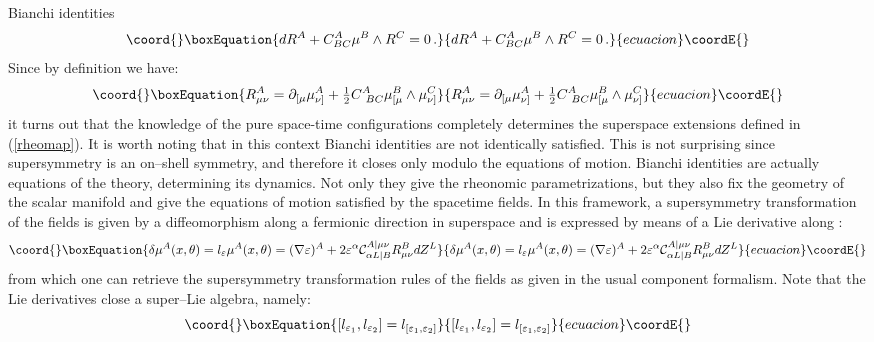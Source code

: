 \documentclass[a4paper,12pt]{article}
\providecommand{\ft}[2]{{\textstyle\frac{#1}{#2}}}
\begin{document}
Bianchi identities
\begin{equation}\coord{}\boxEquation{
dR^A+C^A_{BC}\mu^B\wedge R^C=0\,.
}{
dR^A+C^A_{BC}\mu^B\wedge R^C=0\,.
}{ecuacion}\coordE{}\end{equation}
Since by definition we have:
\begin{equation}\coord{}\boxEquation{
R^A_{\mu\nu}=\partial_{[\mu}\mu^A_{\nu]}+{\ft 1 2} C^A_{~BC}\mu^B_{[\mu}\wedge\mu^C_{\nu]}
}{
R^A_{\mu\nu}=\partial_{[\mu}\mu^A_{\nu]}+{\ft 1 2} C^A_{~BC}\mu^B_{[\mu}\wedge\mu^C_{\nu]}
}{ecuacion}\coordE{}\end{equation}
it turns out that the knowledge of the pure space-time configurations
\coordHE{}
completely determines the superspace extensions defined in (\ref{rheomap}).
It is worth noting that in this context  Bianchi
identities are not identically satisfied. This
is not surprising since supersymmetry is an on--shell symmetry,
and therefore it closes only modulo the equations of motion.
Bianchi identities are actually
equations of the theory, determining its dynamics.  Not only they give the
rheonomic parametrizations, but they also fix the geometry of the scalar manifold
and give the equations of motion satisfied by the spacetime fields.
In this framework, a supersymmetry transformation of the fields \coordHE{} is
given by a diffeomorphism along a fermionic direction in superspace
\myHighlight{$\varepsilon=\varepsilon^{\alpha}\partial_{\alpha}$}\coordHE{} and is expressed
by means of a Lie derivative along \myHighlight{$\varepsilon$}\coordHE{}:
\begin{equation}\coord{}\boxEquation{
\delta\mu^A(x,\theta)=l_{\varepsilon}\mu^A(x,\theta) = (\nabla\varepsilon)^A
+ 2 \varepsilon^{\alpha}\mathcal{C}^{A|\mu\nu}_{\alpha L|B}R^B_{\mu\nu}dZ^L
\label{lie}
}{
\delta\mu^A(x,\theta)=l_{\varepsilon}\mu^A(x,\theta) = (\nabla\varepsilon)^A
+ 2 \varepsilon^{\alpha}\mathcal{C}^{A|\mu\nu}_{\alpha L|B}R^B_{\mu\nu}dZ^L
}{ecuacion}\coordE{}\end{equation}
from which one can retrieve the  supersymmetry transformation rules of the
fields \myHighlight{$\delta\psi_{\mu},\dots$}\coordHE{} as given
in the usual component formalism. Note that the Lie derivatives \coordHE{}
close a super--Lie algebra, namely:
\begin{equation}\coord{}\boxEquation{
\left[l_{\varepsilon_1},l_{\varepsilon_2}\right] = l_{[\varepsilon_1,\varepsilon_2]}
}{
\left[l_{\varepsilon_1},l_{\varepsilon_2}\right] = l_{[\varepsilon_1,\varepsilon_2]}
}{ecuacion}\coordE{}\end{equation}
\end{document}
